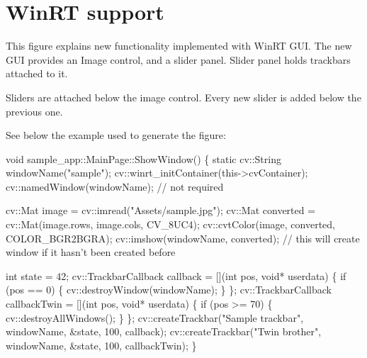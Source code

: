 \hypertarget{group__highgui__winrt}{}\section{Win\+RT support}
\label{group__highgui__winrt}
This figure explains new functionality implemented with Win\+RT G\+UI. The new G\+UI provides an Image control, and a slider panel. Slider panel holds trackbars attached to it. 

Sliders are attached below the image control. Every new slider is added below the previous one. 

See below the example used to generate the figure\+: 
\begin{DoxyPre}
\begin{DoxyCode}
\textcolor{keywordtype}{void} sample\_app::MainPage::ShowWindow()
\{
    \textcolor{keyword}{static} cv::String windowName(\textcolor{stringliteral}{"sample"});
    cv::winrt\_initContainer(this->cvContainer);
    cv::namedWindow(windowName); \textcolor{comment}{// not required}

    cv::Mat image = cv::imread(\textcolor{stringliteral}{"Assets/sample.jpg"});
    cv::Mat converted = cv::Mat(image.rows, image.cols, CV\_8UC4);
    cv::cvtColor(image, converted, COLOR\_BGR2BGRA);
    cv::imshow(windowName, converted); \textcolor{comment}{// this will create window if it hasn't been created before}

    \textcolor{keywordtype}{int} state = 42;
    cv::TrackbarCallback callback = [](\textcolor{keywordtype}{int} pos, \textcolor{keywordtype}{void}* userdata)
    \{
        \textcolor{keywordflow}{if} (pos == 0) \{
            cv::destroyWindow(windowName);
        \}
    \};
    cv::TrackbarCallback callbackTwin = [](\textcolor{keywordtype}{int} pos, \textcolor{keywordtype}{void}* userdata)
    \{
        \textcolor{keywordflow}{if} (pos >= 70) \{
            cv::destroyAllWindows();
        \}
    \};
    cv::createTrackbar(\textcolor{stringliteral}{"Sample trackbar"}, windowName, &state, 100, callback);
    cv::createTrackbar(\textcolor{stringliteral}{"Twin brother"}, windowName, &state, 100, callbackTwin);
\}
\end{DoxyCode}
 \end{DoxyPre}
 